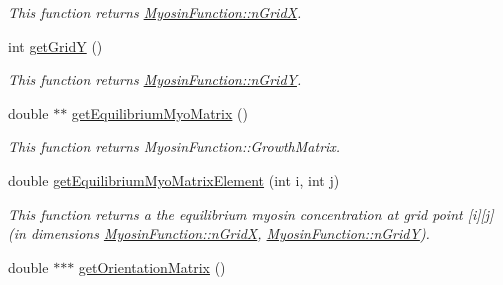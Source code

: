 \begin{DoxyCompactItemize}
\begin{DoxyCompactList}\small\item\em This function returns \hyperlink{classMyosinFunction_a36ac0b5ce87011878a7f1954e270e5ae}{Myosin\+Function\+::n\+Grid\+X}. \end{DoxyCompactList}\item 
\hypertarget{classMyosinFunction_ab73e8b8b716defffabf6b3bf23d606d9}{}int \hyperlink{classMyosinFunction_ab73e8b8b716defffabf6b3bf23d606d9}{get\+Grid\+Y} ()\label{classMyosinFunction_ab73e8b8b716defffabf6b3bf23d606d9}

\begin{DoxyCompactList}\small\item\em This function returns \hyperlink{classMyosinFunction_a1652a8a0d154b136434bee037e0262a4}{Myosin\+Function\+::n\+Grid\+Y}. \end{DoxyCompactList}\item 
\hypertarget{classMyosinFunction_a59fb2bb53bf315ab2740ab27f7fa7536}{}double $\ast$$\ast$ \hyperlink{classMyosinFunction_a59fb2bb53bf315ab2740ab27f7fa7536}{get\+Equilibrium\+Myo\+Matrix} ()\label{classMyosinFunction_a59fb2bb53bf315ab2740ab27f7fa7536}

\begin{DoxyCompactList}\small\item\em This function returns Myosin\+Function\+::\+Growth\+Matrix. \end{DoxyCompactList}\item 
\hypertarget{classMyosinFunction_ac8b8b7bd3c067e83f36f42930c5fd45d}{}double \hyperlink{classMyosinFunction_ac8b8b7bd3c067e83f36f42930c5fd45d}{get\+Equilibrium\+Myo\+Matrix\+Element} (int i, int j)\label{classMyosinFunction_ac8b8b7bd3c067e83f36f42930c5fd45d}

\begin{DoxyCompactList}\small\item\em This function returns a the equilibrium myosin concentration at grid point \mbox{[}i\mbox{]}\mbox{[}j\mbox{]} (in dimensions \hyperlink{classMyosinFunction_a36ac0b5ce87011878a7f1954e270e5ae}{Myosin\+Function\+::n\+Grid\+X}, \hyperlink{classMyosinFunction_a1652a8a0d154b136434bee037e0262a4}{Myosin\+Function\+::n\+Grid\+Y}). \end{DoxyCompactList}\item 
\hypertarget{classMyosinFunction_a2249447e97be176009c74d34d5219498}{}double $\ast$$\ast$$\ast$ \hyperlink{classMyosinFunction_a2249447e97be176009c74d34d5219498}{get\+Orientation\+Matrix} ()\label{classMyosinFunction_a2249447e97be176009c74d34d5219498}


\end{DoxyCompactItemize}
